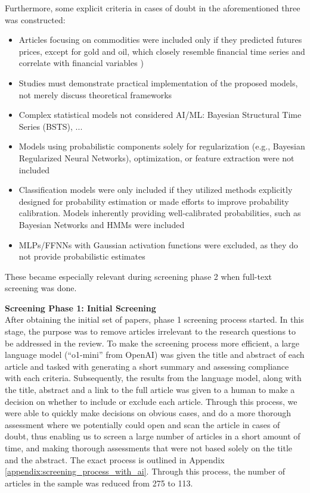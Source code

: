 Furthermore, some explicit criteria in cases of doubt in the aforementioned three was constructed:
\begin{itemize}
    \item Articles focusing on commodities were included only if they predicted futures prices, except for gold and oil, which closely resemble financial time series and correlate with financial variables \cite{Gokmenoglu2015})
    \item Studies must demonstrate practical implementation of the proposed models, not merely discuss theoretical frameworks
    \item Complex statistical models not considered AI/ML: Bayesian Structural Time Series (BSTS), ...  
    \item Models using probabilistic components solely for regularization (e.g., Bayesian Regularized Neural Networks), optimization, or feature extraction were not included
    \item Classification models were only included if they utilized methods explicitly designed for probability estimation or made efforts to improve probability calibration. Models inherently providing well-calibrated probabilities, such as Bayesian Networks and HMMs were included
    \item MLPs/FFNNs with Gaussian activation functions were excluded, as they do not provide probabilistic estimates
\end{itemize}
These became especially relevant during screening phase 2 when full-text screening was done. 

\textbf{Screening Phase 1: Initial Screening} \\
After obtaining the initial set of papers, phase 1 screening process started. In this stage, the purpose was to remove articles irrelevant to the research questions to be addressed in the review.
To make the screening process more efficient, a large language model (``o1-mini'' from OpenAI) was given the title and abstract of each article and tasked with generating a short summary and assessing compliance with each criteria. Subsequently, the results from the language model, along with the title, abstract and a link to the full article was given to a human to make a decision on whether to include or exclude each article. Through this process, we were able to quickly make decisions on obvious cases, and do a more thorough assessment where we potentially could open and scan the article in cases of doubt, thus enabling us to screen a large number of articles in a short amount of time, and making thorough assessments that were not based solely on the title and the abstract. The exact process is outlined in Appendix \ref{appendix:screening_process_with_ai}. Through this process, the number of articles in the sample was reduced from 275 to 113.

